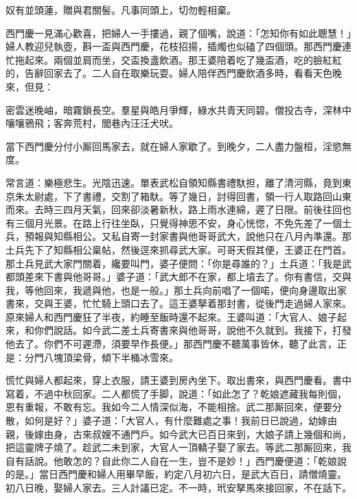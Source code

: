 \begin{myquote} 
奴有並頭蓮，贈與君關髻。凡事同頭上，切勿輕相棄。
\end{myquote} 

西門慶一見滿心歡喜，把婦人一手摟過，親了個嘴，說道：「怎知你有如此聰慧！」{}婦人教迎兒執壺，斟一盃與西門慶，花枝招揚，插燭也似磕了四個頭。那西門慶連忙拖起來。兩個並肩而坐，交盃換盞飲酒。那王婆陪着吃了幾盃酒，吃的臉紅紅的，告辭回家去了。二人自在取樂玩耍。婦人陪伴西門慶飲酒多時，看看天色晚來，但見：

\begin{myquote} 
密雲迷晚岫，暗霧鎖長空。羣星與皓月爭輝，綠水共青天同碧。僧投古寺，深林中嚷嚷鴉飛；客奔荒村，閭巷內汪汪犬吠。
\end{myquote} 

當下西門慶分付小厮回馬家去，就在婦人家歇了。到晚夕，二人盡力盤桓，淫慾無度。

常言道：樂極悲生。光陰迅速。單表武松自領知縣書禮馱担，離了清河縣，竟到東京朱太尉處，下了書禮，交割了箱馱。等了幾日，討得回書，領一行人取路回山東而來。去時三四月天氣，回來卻淡暑新秋，路上雨水連綿，遲了日限。前後往回也有三個月光景。在路上行往坐臥，只覺得神思不安，身心恍惚，{}不免先差了一個土兵，預報與知縣相公。又私自寄一封家書與他哥哥武大，說他只在八月內準還。那土兵先下了知縣相公稟帖，然後逕來抓尋武大家。可哥天假其便，王婆正在門首。那土兵見武大家門關着，纔要叫門，婆子便問：「你是尋誰的？」土兵道：「我是武都頭差來下書與他哥哥。」婆子道：「武大郎不在家，都上墳去了。你有書信，交與我，等他回來，我遞與他，也是一般。」那土兵向前唱了一個喏，便向身邊取出家書來，交與王婆，忙忙騎上頭口去了。這王婆拏着那封書，從後門走過婦人家來。原來婦人和西門慶狂了半夜，約睡至飯時還不起來。王婆叫道：「大官人、娘子起來，和你們說話。如今武二差土兵寄書來與他哥哥，說他不久就到。我接下，打發他去了。你們不可遲滯，須要早作長便。」那西門慶不聽萬事皆休，聽了此言，正是：分門八塊頂梁骨，傾下半桶冰雪來。

慌忙與婦人都起來，穿上衣服，請王婆到房內坐下。取出書來，與西門慶看。書中寫着，不過中秋回家。二人都慌了手脚，說道：「如此怎了？乾娘遮藏我每則個，恩有重報，不敢有忘。我如今二人情深似海，不能相捨。武二那厮回來，便要分散，如何是好？」婆子道：「大官人，有什麼難處之事！我前日已說過，幼嫁由親，後嫁由身，古來叔嫂不通門戶。如今武大已百日來到，大娘子請上幾個和尚，把這靈牌子燒了。趁武二未到家，大官人一頂轎子娶了家去。等武二那厮回來，我自有話說。他敢怎的？自此你二人自在一生，豈不是妙！」西門慶便道：「乾娘說的是。」當日西門慶和婦人用畢早飯，約定八月初六日，是武大百日，請僧燒靈。初八日晚，娶婦人家去。三人計議已定。不一時，玳安拏馬來接回家，不在話下。


